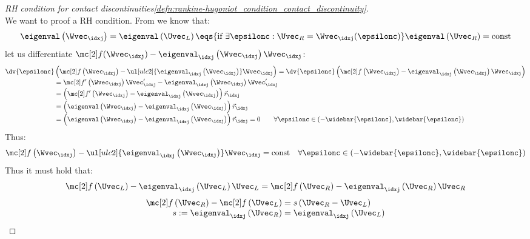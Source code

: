\begin{proofbox}\nospacing
    \begin{proof}[RH condition for contact discontinuities\cref{defn:rankine-hugoniot_condition_contact_discontinuity}]
        \label{proof:defn:rankine-hugoniot_condition_contact_discontinuity}\leavevmode\\
        We want to proof a RH condition. From  we know that:
        \begin{align*}
          \eigenval\left(\Wvec_{\idxj}\right)=\eigenval\left(\Uvec_{L}\right)\eqs{\text{if }\exists\epsilonc:\Uvec_{R}=\Wvec_{\idxj}(\epsilonc)}
          \eigenval\left(\Uvec_{R}\right)=\text{const}
        \end{align*}
        let us differentiate $\flux(\Wvec_{\idxj})-\eigenval_{\idxj} \left(\Wvec_{\idxj}\right)\Wvec_{\idxj}$:
        \begin{align*}
          \dv{\epsilonc}&\left(\flux\left(\Wvec_{\idxj}\right)-\ul[ulc2]{\eigenval_{\idxj} \left(\Wvec_{\idxj}\right)}\Wvec_{\idxj}\right)
          =\dv{\epsilonc}\left(\flux\left(\Wvec_{\idxj}\right)-\eigenval_{\idxj} \left(\Wvec_{\idxj}\right)\Wvec_{\idxj}\right)\\[-1\jot]
          &=\flux'\left(\Wvec_{\idxj}\right)\Wvec'_{\idxj}-\eigenval_{\idxj} \left(\Wvec_{\idxj}\right)\Wvec'_{\idxj}\\[-1\jot]
          &=\left(\flux'\left(\Wvec_{\idxj}\right)-\eigenval_{\idxj} \left(\Wvec_{\idxj}\right)\right)\vec{r}_{\idxj}\\[-1\jot]
          &=\left(\eigenval\left(\Wvec_{\idxj}\right)-\eigenval_{\idxj} \left(\Wvec_{\idxj}\right)\right)\vec{r}_{\idxj}\\[-1\jot]
          &=\left(\eigenval\left(\Wvec_{\idxj}\right)-\eigenval_{\idxj} \left(\Wvec_{\idxj}\right)\right)\vec{r}_{\idxj}=0\qquad\forall\epsilonc\in(-\widebar{\epsilonc},\widebar{\epsilonc})
        \end{align*}
        Thus:
        \begin{align*}
          \flux\left(\Wvec_{\idxj}\right)-\ul[ulc2]{\eigenval_{\idxj} \left(\Wvec_{\idxj}\right)}\Wvec_{\idxj}=\text{const}&&\forall\epsilonc\in(-\widebar{\epsilonc},\widebar{\epsilonc})
        \end{align*}
        Thus it must hold that:
        \begin{align*}
          \flux\left(\Uvec_{L}\right)-\eigenval_{\idxj} \left(\Uvec_{L}\right)\Uvec_{L}
          =\flux\left(\Uvec_{R}\right)-\eigenval_{\idxj} \left(\Uvec_{R}\right)\Uvec_{R}
        \end{align*}
        \begin{align*}
          \flux\left(\Uvec_{R}\right)-\flux\left(\Uvec_{L}\right)
          &=s \left(\Uvec_{R}-\Uvec_{L}\right)\quad \\[-1\jot]
          s:=\eigenval_{\idxj} \left(\Uvec_{R}\right)&=\eigenval_{\idxj} \left(\Uvec_{L}\right)
        \end{align*}
    \end{proof}
\end{proofbox}
